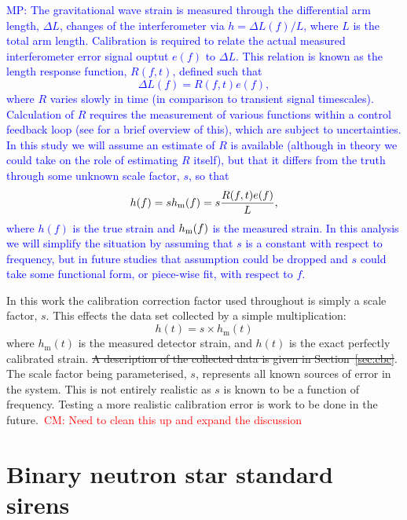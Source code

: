\documentclass[12pt]{iopart}
\newcommand{\cm}[1]{\textcolor{red}{CM: #1}}
\newcommand{\MP}[1]{\textcolor{blue}{MP: #1}}
\begin{document}
\MP{The gravitational wave strain is measured through the differential arm length, $\Delta L$, changes
of the interferometer via $h = \Delta L(f) / L$, where $L$ is the total arm length.
Calibration is required to relate the actual measured interferometer error signal ouptut
$e(f)$ to $\Delta L$. This relation is known as the length response function, $R(f,t)$,
defined such that
\begin{equation}
\Delta L(f) = R(f,t) e(f),
\end{equation}
where $R$ varies slowly in time (in comparison to transient signal timescales).
Calculation of $R$ requires the measurement of various functions within a control feedback loop
(see \cite{Vitale:2012} for a brief overview of this), which are subject to
uncertainties. In this study we will assume an estimate of $R$ is available (although
in theory we could take on the role of estimating $R$ itself), but that it differs from the
truth through some unknown scale factor, $s$, so that
\begin{equation}
h(f) = s h_{\rm m}(f) = s \frac{R(f,t) e(f)}{L},
\end{equation}
where $h(f)$ is the true strain and $h_{\rm m}(f)$ is the measured strain.
In this analysis we will simplify the situation by assuming that $s$ is a constant with
respect to frequency, but in future studies that assumption could be dropped and $s$
could take some functional form, or piece-wise fit, with respect to $f$.
}

In this work the calibration correction factor used throughout is simply a scale
factor, $s$. This effects the data set collected by a simple multiplication:
%
\begin{equation}\label{eq:scaledata}
  h(t) = s\times h_{\mathrm{m}}(t)
\end{equation}
%
where $h_{\mathrm{m}}(t)$ is the measured detector strain, and
$h(t)$ is the exact perfectly calibrated strain. \sout{A description of the
collected data is given in Section~\ref{sec:cbc}}. The scale factor being
parameterised, $s$, represents all known sources of error in the system. This
is not entirely realistic as $s$ is known to be a function of frequency.
Testing a more realistic calibration error is work to be done in the
future.~\cm{Need to clean this up and expand the discussion}

\section{Binary neutron star standard sirens\label{sec:sirens}}
\end{document}
